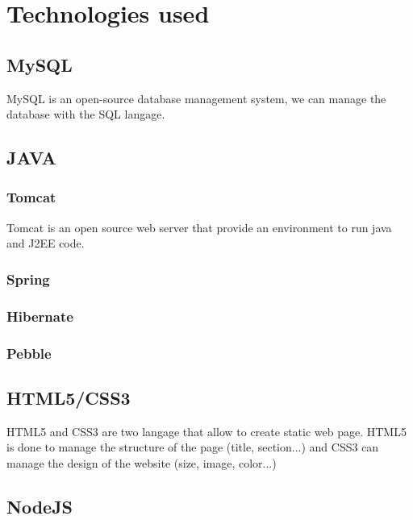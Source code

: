 \chapter{Technologies used}

\section{MySQL}

MySQL is an open-source database management system, we can manage the database with the SQL langage.  

\section{JAVA}
\subsection{Tomcat}

Tomcat is an open source web server that provide an environment to run java and J2EE code.

\subsection{Spring}



\subsection{Hibernate}



\subsection{Pebble}


\section{HTML5/CSS3}

HTML5 and CSS3 are two langage that allow to create static web page.
HTML5 is done to manage the structure of the page (title, section...) and CSS3 can manage the design of the website (size, image, color...)


\section{NodeJS}



